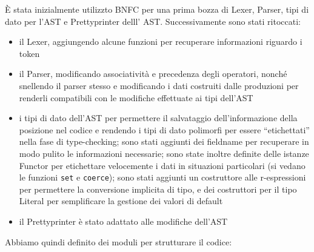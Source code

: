 \documentclass{report}
\newcommand{\term}[1]{\texttt{#1}}
\begin{document}
È stata inizialmente utilizzto BNFC per una prima bozza di Lexer, Parser, tipi di dato per l'AST e 
Prettyprinter delll' AST. Successivamente sono stati ritoccati:
\begin{itemize}
    \item il Lexer, aggiungendo alcune funzioni per recuperare informazioni riguardo i token
    \item il Parser, modificando associatività e precedenza degli operatori, nonché snellendo
        il parser stesso e modificando i dati costruiti dalle produzioni per renderli compatibili con
        le modifiche effettuate ai tipi dell'AST
    \item i tipi di dato dell'AST per permettere il salvataggio dell'informazione della posizione nel codice e
        rendendo i tipi di dato polimorfi per essere ``etichettati'' nella fase di type-checking; sono stati aggiunti
        dei fieldname per recuperare in modo pulito le informazioni necessarie; sono state inoltre definite delle istanze
        Functor per etichettare velocemente i dati in situazioni particolari (si vedano le funzioni \term{set} e \term{coerce});
        sono stati aggiunti un costruttore alle r-espressioni per permettere la conversione implicita di tipo, e dei costruttori
        per il tipo Literal per semplificare la gestione dei valori di default
    \item il Prettyprinter è stato adattato alle modifiche dell'AST
\end{itemize}

Abbiamo quindi definito dei moduli per strutturare il codice:
\end{document}
